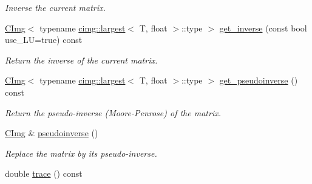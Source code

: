 \begin{DoxyCompactItemize}
\begin{DoxyCompactList}\small\item\em Inverse the current matrix. \item\end{DoxyCompactList}\item 
\hypertarget{structcimg__library_1_1_c_img_a291873d1a51e08889cdc40c933863790}{
\hyperlink{structcimg__library_1_1_c_img}{CImg}$<$ typename \hyperlink{structcimg__library_1_1cimg_1_1largest}{cimg::largest}$<$ T, float $>$::type $>$ \hyperlink{structcimg__library_1_1_c_img_a291873d1a51e08889cdc40c933863790}{get\_\-inverse} (const bool use\_\-LU=true) const }
\label{structcimg__library_1_1_c_img_a291873d1a51e08889cdc40c933863790}

\begin{DoxyCompactList}\small\item\em Return the inverse of the current matrix. \item\end{DoxyCompactList}\item 
\hypertarget{structcimg__library_1_1_c_img_ae26e9d4883ddef119c350b3c64e664b4}{
\hyperlink{structcimg__library_1_1_c_img}{CImg}$<$ typename \hyperlink{structcimg__library_1_1cimg_1_1largest}{cimg::largest}$<$ T, float $>$::type $>$ \hyperlink{structcimg__library_1_1_c_img_ae26e9d4883ddef119c350b3c64e664b4}{get\_\-pseudoinverse} () const }
\label{structcimg__library_1_1_c_img_ae26e9d4883ddef119c350b3c64e664b4}

\begin{DoxyCompactList}\small\item\em Return the pseudo-\/inverse (Moore-\/Penrose) of the matrix. \item\end{DoxyCompactList}\item 
\hypertarget{structcimg__library_1_1_c_img_a98c73e6910ed84eb7e9fe23a7e822f04}{
\hyperlink{structcimg__library_1_1_c_img}{CImg} \& \hyperlink{structcimg__library_1_1_c_img_a98c73e6910ed84eb7e9fe23a7e822f04}{pseudoinverse} ()}
\label{structcimg__library_1_1_c_img_a98c73e6910ed84eb7e9fe23a7e822f04}

\begin{DoxyCompactList}\small\item\em Replace the matrix by its pseudo-\/inverse. \item\end{DoxyCompactList}\item 
\hypertarget{structcimg__library_1_1_c_img_acbf8651f447f39520618ff22f0649d58}{
double \hyperlink{structcimg__library_1_1_c_img_acbf8651f447f39520618ff22f0649d58}{trace} () const }
\label{structcimg__library_1_1_c_img_acbf8651f447f39520618ff22f0649d58}


\end{DoxyCompactItemize}
